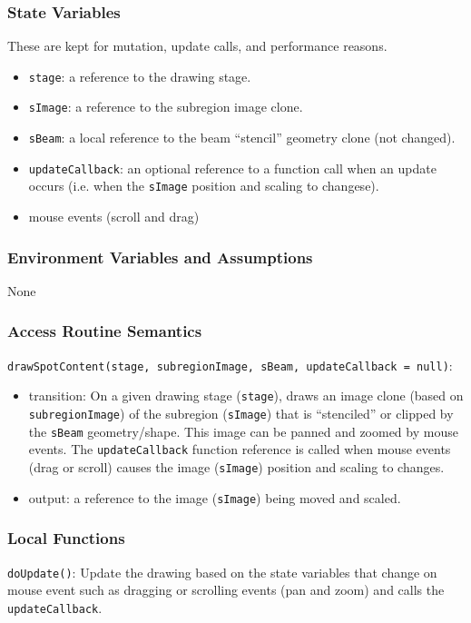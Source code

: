 \documentclass[12pt, titlepage]{article}
\newcommand{\code}[1]{\texttt{#1}}
\begin{document}
\subsubsection{State Variables}
These are kept for mutation, update calls, and performance reasons.
\begin{itemize}
  \item \code{stage}: a reference to the drawing stage.
  \item \code{sImage}: a reference to the subregion image clone.
  \item \code{sBeam}: a local reference to the beam ``stencil'' geometry clone (not changed).
  \item \code{updateCallback}: an optional reference to a function call when an update occurs
  (i.e. when the \code{sImage} position and scaling to changese).
  \item mouse events (scroll and drag)
\end{itemize}

\subsubsection{Environment Variables and Assumptions}
None

\subsubsection{Access Routine Semantics}

\noindent \code{drawSpotContent(stage, subregionImage, sBeam, updateCallback = null)}:
\begin{itemize}
\item transition: On a given drawing stage (\code{stage}),
  draws an image clone (based on \code{subregionImage}) of the subregion (\code{sImage})
  that is ``stenciled'' or clipped by the \code{sBeam} geometry/shape.
  This image can be panned and zoomed by mouse events.
  The \code{updateCallback} function reference is called when mouse events
  (drag or scroll) causes the image (\code{sImage}) position and scaling to changes.
\item output: a reference to the image (\code{sImage}) being moved and scaled.
\end{itemize}

\subsubsection{Local Functions}
\code{doUpdate()}: Update the drawing based on the state variables that change on mouse event
  such as dragging or scrolling events (pan and zoom) and calls the \code{updateCallback}.
\end{document}
